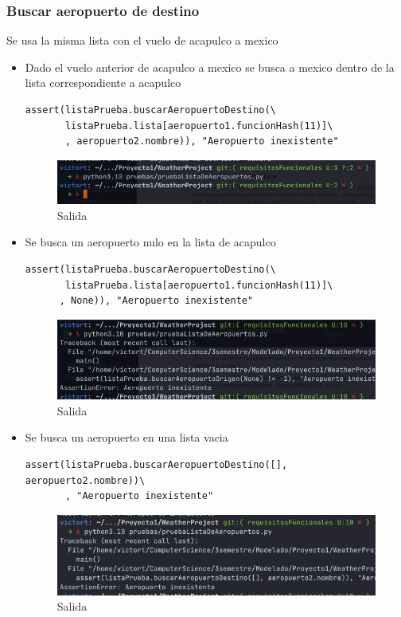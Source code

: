 \documentclass[12pt]{article}
\begin{document}
\subsubsection{Buscar aeropuerto de destino}
Se usa la misma lista con el vuelo de acapulco a mexico
\begin{itemize}
\item Dado el vuelo anterior de acapulco a mexico se busca a mexico dentro de la lista correspondiente a acapulco
\begin{verbatim}
assert(listaPrueba.buscarAeropuertoDestino(\
       listaPrueba.lista[aeropuerto1.funcionHash(11)]\
       , aeropuerto2.nombre)), "Aeropuerto inexistente"
\end{verbatim}
  \newpage
\begin{figure}[h!]
    \centering
    \includegraphics[scale=0.6]{pruebasPy/listaAeropuertos/bien.png}
    \caption{Salida}
  \end{figure}

\item Se busca un aeropuerto nulo en la lista de acapulco
\begin{verbatim}
assert(listaPrueba.buscarAeropuertoDestino(\
       listaPrueba.lista[aeropuerto1.funcionHash(11)]\
      , None)), "Aeropuerto inexistente"
\end{verbatim}
\begin{figure}[h!]
    \centering
    \includegraphics[scale=0.6]{pruebasPy/listaAeropuertos/buscaNone.png}
    \caption{Salida}
  \end{figure}
\item Se busca un aeropuerto en una lista vacia
\begin{verbatim}
assert(listaPrueba.buscarAeropuertoDestino([], aeropuerto2.nombre))\
       , "Aeropuerto inexistente"
\end{verbatim}
\begin{figure}[h!]
    \centering
    \includegraphics[scale=0.6]{pruebasPy/listaAeropuertos/buscaDvacio.png}
    \caption{Salida}
  \end{figure}
\end{itemize}
\end{document}
